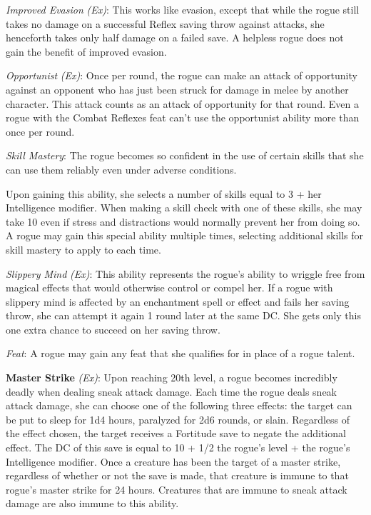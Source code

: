 \textit{Improved Evasion} \textit{(Ex)}: This works like evasion, except that while the rogue still takes no damage on a successful Reflex saving throw against attacks, she henceforth takes only half damage on a failed save. A helpless rogue does not gain the benefit of improved evasion.
				
\textit{Opportunist} \textit{(Ex)}: Once per round, the rogue can make an attack of opportunity against an opponent who has just been struck for damage in melee by another character. This attack counts as an attack of opportunity for that round. Even a rogue with the Combat Reflexes feat can't use the opportunist ability more than once per round.
				
\textit{Skill Mastery}: The rogue becomes so confident in the use of certain skills that she can use them reliably even under adverse conditions.
				
Upon gaining this ability, she selects a number of skills equal to 3 + her Intelligence modifier. When making a skill check with one of these skills, she may take 10 even if stress and distractions would normally prevent her from doing so. A rogue may gain this special ability multiple times, selecting additional skills for skill mastery to apply to each time.
				
\textit{Slippery Mind} \textit{(Ex)}: This ability represents the rogue's ability to wriggle free from magical effects that would otherwise control or compel her. If a rogue with slippery mind is affected by an enchantment spell or effect and fails her saving throw, she can attempt it again 1 round later at the same DC. She gets only this one extra chance to succeed on her saving throw.
				
\textit{Feat}: A rogue may gain any feat that she qualifies for in place of a rogue talent.
				
\textbf{Master Strike }\textit{(Ex)}: Upon reaching 20th level, a rogue becomes incredibly deadly when dealing sneak attack damage. Each time the rogue deals sneak attack damage, she can choose one of the following three effects: the target can be put to sleep for 1d4 hours, paralyzed for 2d6 rounds, or slain. Regardless of the effect chosen, the target receives a Fortitude save to negate the additional effect. The DC of this save is equal to 10 + 1/2 the rogue's level + the rogue's Intelligence modifier. Once a creature has been the target of a master strike, regardless of whether or not the save is made, that creature is immune to that rogue's master strike for 24 hours. Creatures that are immune to sneak attack damage are also immune to this ability.
        	
